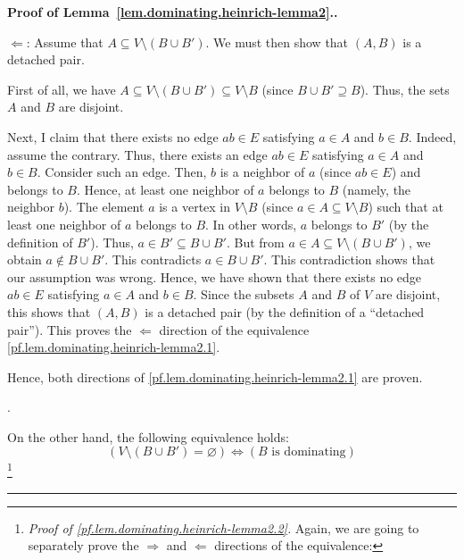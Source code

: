 \documentclass[numbers=enddot,12pt,final,onecolumn,notitlepage]{scrartcl}%
\theoremstyle{definition}
\newenvironment{proof}[1][Proof]{\noindent\textbf{#1.} }{\ \rule{0.5em}{0.5em}}
\newcommand{\tup}[1]{\left( #1 \right)}
\begin{document}
\begin{proof}[Proof of Lemma~\ref{lem.dominating.heinrich-lemma2}.]
{$\Longleftarrow$: Assume that
$A \subseteq V \setminus \tup{B \cup B'}$. We must then show
that $\tup{A, B}$ is a detached pair.

First of all, we have
$A \subseteq V \setminus \tup{B \cup B'}
\subseteq V \setminus B$ (since $B \cup B' \supseteq B$).
Thus, the sets $A$ and $B$ are disjoint.

Next, I claim that there exists no edge
$ab \in E$ satisfying $a \in A$ and $b \in B$. Indeed, assume the
contrary. Thus, there exists an edge $ab \in E$ satisfying $a \in A$
and $b \in B$. Consider such an edge. Then, $b$ is a neighbor of $a$
(since $ab \in E$) and belongs to $B$. Hence, at least one neighbor
of $a$ belongs to $B$ (namely, the neighbor $b$).
The element $a$ is a vertex in
$V \setminus B$ (since $a \in A \subseteq V \setminus B$) such that
at least one neighbor of $a$ belongs to $B$. In other words, $a$
belongs to $B'$ (by the definition of $B'$). Thus, $a \in B'
\subseteq B \cup B'$. But from
$a \in A \subseteq V \setminus \tup{B \cup B'}$, we obtain
$a \notin B \cup B'$. This contradicts $a \in B \cup B'$. This
contradiction shows that our assumption was wrong. Hence, we have
shown that there exists no edge
$ab \in E$ satisfying $a \in A$ and $b \in B$. Since the subsets $A$
and $B$ of $V$ are disjoint, this shows that $\tup{A, B}$ is a
detached pair (by the definition of a ``detached pair''). This proves
the $\Longleftarrow$ direction of the equivalence
\eqref{pf.lem.dominating.heinrich-lemma2.1}.

Hence, both directions of \eqref{pf.lem.dominating.heinrich-lemma2.1}
are proven.}.

On the other hand, the following equivalence holds:
\begin{equation}
\left( V \setminus \tup{B \cup B'} = \varnothing \right)
\Longleftrightarrow
\left( B \text{ is dominating} \right)
\label{pf.lem.dominating.heinrich-lemma2.2}
\end{equation}
\footnote{\textit{Proof of
\eqref{pf.lem.dominating.heinrich-lemma2.2}.}
Again, we are going to
separately prove the $\Longrightarrow$ and $\Longleftarrow$ directions
of the equivalence:

}
\end{proof}
\end{document}

